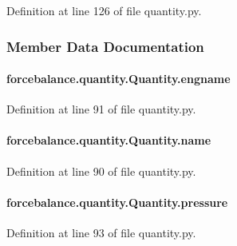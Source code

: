Definition at line 126 of file quantity.\-py.



\subsubsection{Member Data Documentation}
\hypertarget{classforcebalance_1_1quantity_1_1Quantity_a2cd1c71d0780a12b3cbf308d05737055}{
\paragraph[{engname}]{\setlength{\rightskip}{0pt plus 5cm}forcebalance.\-quantity.\-Quantity.\-engname}}\label{classforcebalance_1_1quantity_1_1Quantity_a2cd1c71d0780a12b3cbf308d05737055}


Definition at line 91 of file quantity.\-py.

\hypertarget{classforcebalance_1_1quantity_1_1Quantity_a9122f1e96aa8c0cd146694656bcd0649}{
\paragraph[{name}]{\setlength{\rightskip}{0pt plus 5cm}forcebalance.\-quantity.\-Quantity.\-name}}\label{classforcebalance_1_1quantity_1_1Quantity_a9122f1e96aa8c0cd146694656bcd0649}


Definition at line 90 of file quantity.\-py.

\hypertarget{classforcebalance_1_1quantity_1_1Quantity_a972fbe22434f2aedca70addaed1a0bea}{
\paragraph[{pressure}]{\setlength{\rightskip}{0pt plus 5cm}forcebalance.\-quantity.\-Quantity.\-pressure}}\label{classforcebalance_1_1quantity_1_1Quantity_a972fbe22434f2aedca70addaed1a0bea}


Definition at line 93 of file quantity.\-py.

